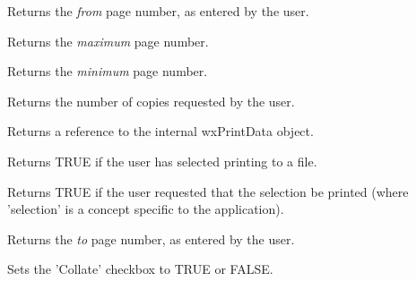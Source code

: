 Returns the {\it from} page number, as entered by the user.

\label{wxprintdialogdatagetmaxpage}


Returns the {\it maximum} page number.

\label{wxprintdialogdatagetminpage}


Returns the {\it minimum} page number.

\label{wxprintdialogdatagetnocopies}


Returns the number of copies requested by the user.

\label{wxprintdialogdatagetprintdata}


Returns a reference to the internal wxPrintData object.

\label{wxprintdialogdatagetprinttofile}


Returns TRUE if the user has selected printing to a file.

\label{wxprintdialogdatagetselection}


Returns TRUE if the user requested that the selection be printed (where 'selection' is
a concept specific to the application).

\label{wxprintdialogdatagettopage}


Returns the {\it to} page number, as entered by the user.

\label{wxprintdialogdatasetcollate}


Sets the 'Collate' checkbox to TRUE or FALSE.

\label{wxprintdialogdatasetfrompage}

